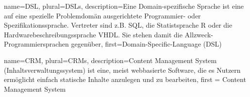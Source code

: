  {
  name={DSL},
  plural={DSLs},
  description={Eine Domain-spezifische Sprache ist eine auf eine spezielle Problemdomän ausgerichtete Programmier- oder Spezifikationssprache. Vertreter sind z.B. SQL, die Statistsprache R oder die Hardwarebeschreibungssprache VHDL. Sie stehen damit die Allzweck-Programmiersprachen gegenüber},
  first={Domain-Specific-Language (DSL)}
}


 {
  name={CRM},
  plural={CRMs},
  description={Content Management System (Inhaltsverwaltungssystem) ist eine, meist webbasierte Software, die es Nutzern ermöglicht einfach statische Inhalte anzulegen und zu bearbeiten},
first = {Content Management System}
}
\newcommand{\glossar}[1]{$^\uparrow$\gls{#1}}

\newcommand{\glossarpl}[1]{$^\uparrow$\glspl{#1}}
\glsaddall

\renewcommand{\glossarypreamble}{Im Folgenden werden einige oft-verwendete Begriffe näher erläutert. Innerhalb des Hauptteils dieser Arbeit sind diese Begriffe mit einem $^\uparrow$ gekennzeichnet}

\printglossary[toctitle=Glossar]

